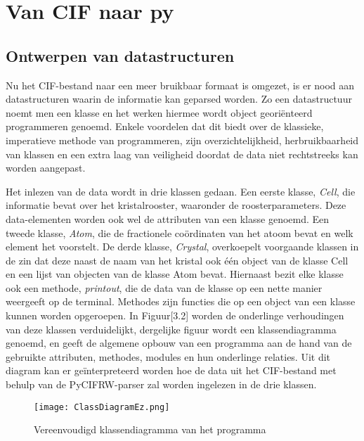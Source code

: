 \section{Van CIF naar py}

\subsection{Ontwerpen van datastructuren}
Nu het CIF-bestand naar een meer bruikbaar formaat is omgezet, is er nood aan datastructuren waarin de informatie kan geparsed worden. Zo een datastructuur noemt men een klasse en het werken hiermee wordt object georiënteerd programmeren genoemd. Enkele voordelen dat dit biedt over de klassieke, imperatieve methode van programmeren, zijn overzichtelijkheid, herbruikbaarheid van klassen en een extra laag van veiligheid doordat de data niet rechtstreeks kan worden aangepast.
\par
Het inlezen van de data wordt in drie klassen gedaan. Een eerste klasse, \textit{Cell}, die informatie bevat over het kristalrooster, waaronder de roosterparameters. Deze data-elementen worden ook wel de attributen van een klasse genoemd. Een tweede klasse, \textit{Atom}, die de fractionele coördinaten van het atoom bevat en welk element het voorstelt. De derde klasse, \textit{Crystal}, overkoepelt voorgaande klassen in de zin dat deze naast de naam van het kristal ook één object van de klasse Cell en een lijst van objecten van de klasse Atom bevat. Hiernaast bezit elke klasse ook een methode, \textit{printout}, die de data van de klasse op een nette manier weergeeft op de terminal. Methodes zijn functies die op een object van een klasse kunnen worden opgeroepen.  In Figuur[3.2] worden de onderlinge verhoudingen van deze klassen verduidelijkt, dergelijke figuur wordt een klassendiagramma genoemd, en geeft de algemene opbouw van een programma aan de hand van de gebruikte attributen, methodes, modules en hun onderlinge relaties. Uit dit diagram kan er geïnterpreteerd worden hoe de data uit het CIF-bestand met behulp van de PyCIFRW-parser zal worden ingelezen in de drie klassen.

\begin{figure}[h]
\texttt{[image: ClassDiagramEz.png]}
\caption{Vereenvoudigd klassendiagramma van het programma}
\end{figure}

